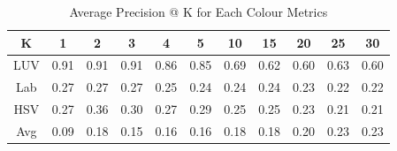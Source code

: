 \begin{table}[!t]
	\centering
	\caption{Average Precision @ K for Each Colour Metrics}
	\label{tab:avg@k}
\begin{tabular}{c||c|c|c|c|c|c|c|c|c|c}
K & 1 & 2 & 3 & 4 & 5 & 10 & 15 & 20 & 25 & 30  \\ \hline \hline
\rowcolor{yellow} LUV  & 0.91 & 0.91 & 0.91 & 0.86 & 0.85 & 0.69 & 0.62 & 0.60 & 0.63 & 0.60 \\
Lab  & 0.27 & 0.27 & 0.27 & 0.25 & 0.24 & 0.24 & 0.24 & 0.23 & 0.22 & 0.22 \\
HSV & 0.27 & 0.36 & 0.30 & 0.27 & 0.29 & 0.25 & 0.25 & 0.23 & 0.21 & 0.21 \\
Avg & 0.09 & 0.18 & 0.15 & 0.16 & 0.16 & 0.18 & 0.18 & 0.20 & 0.23 & 0.23 \\
\end{tabular}
\end{table}


